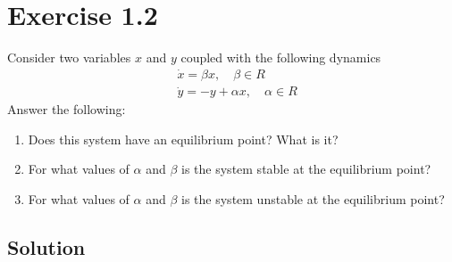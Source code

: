 \section*{Exercise 1.2}

Consider two variables \( x \) and \( y \) coupled with the following dynamics
\begin{align*}
     & \dot{x}=\beta x, \quad \beta \in R      \\
     & \dot{y}=-y+\alpha x, \quad \alpha \in R
\end{align*}
Answer the following:
\begin{enumerate}[noitemsep]
    \item Does this system have an equilibrium point? What is it?
    \item For what values of \( \alpha \) and \( \beta \) is the system stable at the equilibrium point?
    \item For what values of \( \alpha \) and \( \beta \) is the system unstable at the equilibrium point?
\end{enumerate}

\subsection*{Solution}
